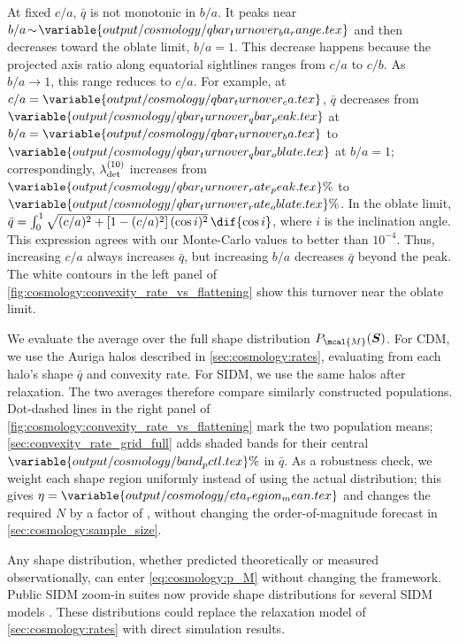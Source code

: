 \documentclass[linenumbers,twocolumn]{aastex701}
\renewcommand{\mbf}[1]{\boldsymbol{#1}}
\newcommand{\lamdadet}[1]{\ensuremath{\lambda_{\rm det}^{({#1})}}}
\begin{document}
        At fixed $c/a$, $\bar{q}$ is not monotonic in $b/a$. %
        It peaks near $b/a\!\sim\!\variable{output/cosmology/qbar_turnover_ba_range.tex}$ and then decreases toward the oblate limit, $b/a=1$. %
        This decrease happens because the projected axis ratio along equatorial sightlines ranges from $c/a$ to $c/b$. %
        As $b/a\!\to\!1$, this range reduces to $c/a$. %
        For example, at $c/a=\variable{output/cosmology/qbar_turnover_ca.tex}$, $\bar{q}$ decreases from $\variable{output/cosmology/qbar_turnover_qbar_peak.tex}$ at $b/a=\variable{output/cosmology/qbar_turnover_ba.tex}$ to $\variable{output/cosmology/qbar_turnover_qbar_oblate.tex}$ at $b/a=1$; correspondingly, $\lamdadet{10}$ increases from $\variable{output/cosmology/qbar_turnover_rate_peak.tex}\%$ to $\variable{output/cosmology/qbar_turnover_rate_oblate.tex}\%$. %
        In the oblate limit, $\bar{q}=\int_{0}^{1}\sqrt{(c/a)^{2}+[1-(c/a)^{2}]\,(\cos{i})^{2}}\,\dif{\cos{i}}$, where $i$ is the inclination angle. %
        This expression agrees with our Monte-Carlo values to better than $10^{-4}$. %
        Thus, increasing $c/a$ always increases $\bar{q}$, but increasing $b/a$ decreases $\bar{q}$ beyond the peak. %
        The white contours in the left panel of \autoref{fig:cosmology:convexity_rate_vs_flattening} show this turnover near the oblate limit. %

        We evaluate the average over the full shape distribution $P_{\mcal{M}}(\mbf{S})$. %
        For \gls{CDM}, we use the Auriga halos described in \autoref{sec:cosmology:rates}, evaluating from each halo's shape $\bar{q}$ and convexity rate. %
        For \gls{SIDM}, we use the same halos after relaxation. %
        The two averages therefore compare similarly constructed populations. %
        Dot-dashed lines in the right panel of \autoref{fig:cosmology:convexity_rate_vs_flattening} mark the two population means; \autoref{sec:convexity_rate_grid_full} adds shaded bands for their central $\variable{output/cosmology/band_pctl.tex}\%$ in $\bar{q}$. %
        As a robustness check, we weight each shape region uniformly instead of using the actual distribution; this gives $\eta=\variable{output/cosmology/eta_region_mean.tex}$ and changes the required $N$ by a factor of , without changing the order-of-magnitude forecast in \autoref{sec:cosmology:sample_size}. %

        Any shape distribution, whether predicted theoretically or measured observationally, can enter \cref{eq:cosmology:p_M} without changing the framework. %
        Public \gls{SIDM} zoom-in suites now provide shape distributions for several \gls{SIDM} models \citep{Nadler+:2025:SIDMConcertoCompilation}. %
        These distributions could replace the relaxation model of \autoref{sec:cosmology:rates} with direct simulation results. %
\end{document}
